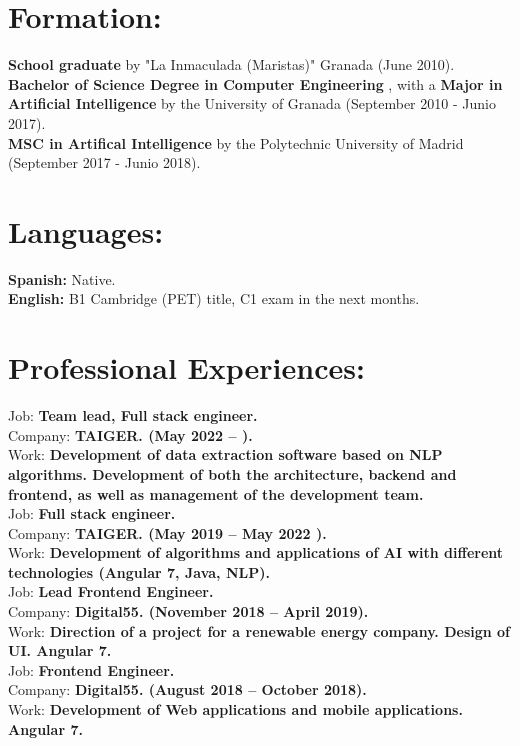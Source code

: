 \documentclass	[10pt,a4paper,oneside]{article}
\newcommand{\seccion}[1]{\vspace*{3mm}\section*{#1}\vspace*{-3mm}}
\begin{document}
\seccion{Formation:}
\textbf{School graduate} by "La Inmaculada (Maristas)" Granada (June 2010).\\
\textbf{Bachelor of Science Degree in Computer Engineering} , with a \textbf{Major in Artificial Intelligence} by the University of Granada (September 2010 - Junio 2017).\\
\textbf{MSC in Artifical Intelligence} by the Polytechnic University of Madrid (September 2017 - Junio 2018).\\

\seccion{Languages:}
\textbf{Spanish:} Native.\\
\textbf{English:} B1 Cambridge (PET) title, C1 exam in the next months.\\


\seccion{Professional Experiences:}

Job: \textbf{Team lead, Full stack engineer.}\\
Company: \textbf{TAIGER. (May 2022 –  ).}\\
Work: \textbf{Development of data extraction software based on NLP algorithms. Development of both the architecture, backend and frontend, as well as management of the development team.}\\

Job: \textbf{Full stack engineer.}\\
Company: \textbf{TAIGER. (May 2019 – May 2022 ).}\\
Work: \textbf{Development of algorithms and applications of AI with different technologies (Angular 7, Java, NLP).}\\

Job: \textbf{Lead Frontend Engineer.}\\
Company: \textbf{Digital55. (November 2018 – April 2019).}\\
Work: \textbf{Direction of a project for a renewable energy company. Design of UI. Angular 7.}\\

Job: \textbf{Frontend Engineer.}\\
Company: \textbf{Digital55. (August 2018 – October 2018).}\\
Work: \textbf{Development of Web applications and mobile applications. Angular 7.}\\
\end{document}
